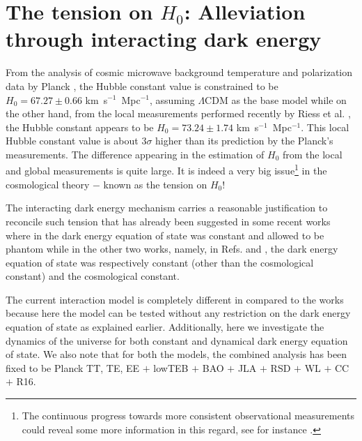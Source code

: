 \documentclass[superscriptaddress,oneolumn,secnumarabic,
amssymb,amsmath,nobibnotes,aps,prd,showpacs,nofootinbib]{revtex4}%
\begin{document}
\section{The tension on $H_0$: Alleviation through interacting dark energy}
\label{sec-tension}

From the analysis of cosmic microwave background temperature
and polarization data by Planck \cite{Ade:2015xua}, the Hubble
constant value is constrained to be $H_0= 67.27 \pm 0.66$ km~s$^{-1}$~Mpc$^{-1}$,
assuming $\Lambda$CDM as the base model while on the other hand, from the local
measurements performed recently by Riess et al. \cite{Riess:2016jrr}, the Hubble
constant appears to be $H_0 = 73.24 \pm 1.74$ km~s$^{-1}$~Mpc$^{-1}$. This local
Hubble constant value is about $3\sigma$ higher than its prediction by the
Planck's measurements. The difference appearing in the estimation of $H_0$ from the local and global measurements is quite large.
It is indeed a very big issue\footnote{The continuous
progress towards more consistent observational measurements could reveal
some more information in this regard, see for instance \cite{Lin:2017ikq,  Lin:2017bhs}.}
in the cosmological theory $-$ known as the tension on $H_0$!


The interacting dark energy mechanism carries a reasonable justification
to reconcile such tension that has already been suggested in some
recent works \cite{Kumar:2016zpg, Kumar:2017dnp, DiValentino:2017iww} where
in \cite{DiValentino:2017iww} the dark energy equation of state
was constant and allowed to be phantom while in the other two works, namely,
in Refs. \cite{Kumar:2016zpg} and \cite{Kumar:2017dnp}, the dark energy equation of state
was respectively constant (other than the cosmological constant) and the cosmological constant.

The current interaction model is completely different in
compared to the works \cite{Kumar:2016zpg, Kumar:2017dnp, DiValentino:2017iww}
because here the model can be tested without any restriction on the
dark energy equation of state as explained earlier. Additionally,
here we investigate the dynamics of the universe for both constant and
dynamical dark energy equation of state. We also note that for both the models,
the combined analysis has been fixed to be Planck TT, TE, EE $+$
lowTEB $+$ BAO $+$ JLA $+$ RSD $+$ WL $+$ CC $+$ R16.
\end{document}
